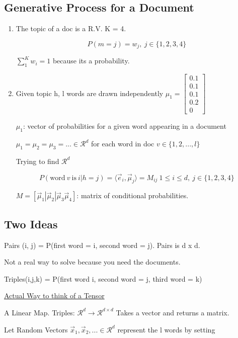 \documentclass[11pt]{article}
\begin{document}
\subsection{Generative Process for a Document}
\label{sec:org21ae7cf}
\begin{enumerate}
\item The topic of a doc is a R.V. K = 4.

$$
   P(m = j) = w_{j}, \ j \in \{1,2,3,4\}
   $$

\(\sum_{1}^{K}w_i = 1\) because its a probability.
\item Given topic h, l words are drawn independently
\(\mu_1 = \begin{bmatrix}0.1\\ 0.1\\ 0.1\\ 0.2\\ 0\end{bmatrix}\)

\(\mu_1\): vector of probabilities for a given word appearing in a document

\(\mu_1 = \mu_2 = \mu_3 = ... \in \mathcal R^d\)
for each word in doc \(v \in \{1,2,..., l\}\)

Trying to find \(\mathcal R^d\)

$$
   P(\text{word} \ v \ \text{is} \ i | h = j) = \langle \vec e_i, \vec \mu_j
   \rangle = M_{ij} \ 1 \leq i \leq d, \ j \in \{1,2,3,4\}
   $$

\(M = [\vec \mu_1 | \vec \mu_2 | \vec \mu_3 \vec \mu_4]\): matrix of
conditional probabilities.
\end{enumerate}

\subsection{Two Ideas}
\label{sec:orge6c9b88}

Pairs (i, j) = P(first word = i, second word = j). Pairs is d x d.

Not a real way to solve because you need the documents.

Triples(i,j,k) = P(first word i, second word = j, third word = k)

\uline{Actual Way to think of a Tensor}

A Linear Map. Triples: \(\mathcal R^d \to \mathcal R^{d \times d}\)
Takes a vector and returns a matrix.

Let Random Vectors \(\vec x_1, \vec x_2, ... \in \mathcal R^d\) represent the l
words by setting
\end{document}
